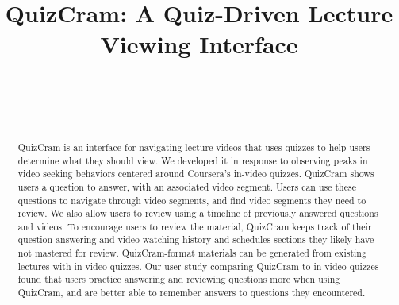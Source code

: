 \documentclass{sigchi}
\begin{document}
\title{QuizCram: A Quiz-Driven Lecture Viewing Interface}

\author{%
  \\
  \\
  \\
}

\maketitle


\begin{abstract}
QuizCram is an interface for navigating lecture videos that uses quizzes to help users determine what they should view. We developed it in response to observing peaks in video seeking behaviors centered around Coursera's in-video quizzes. QuizCram shows users a question to answer, with an associated video segment. Users can use these questions to navigate through video segments, and find video segments they need to review. We also allow users to review using a timeline of previously answered questions and videos. To encourage users to review the material, QuizCram keeps track of their question-answering and video-watching history and schedules sections they likely have not mastered for review. QuizCram-format materials can be generated from existing lectures with in-video quizzes. Our user study comparing QuizCram to in-video quizzes found that users practice answering and reviewing questions more when using QuizCram, and are better able to remember answers to questions they encountered.
\end{abstract}
\end{document}
